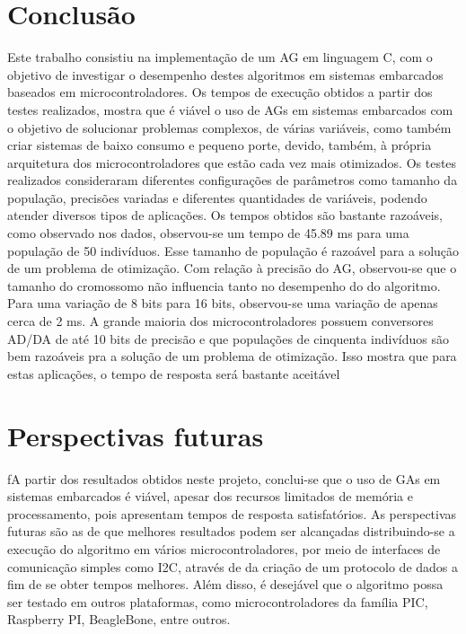 \documentclass[
    12pt,               %
    oneside,%
    a4paper,            %
    english,            %
    french,             %
    spanish,            %
    brazil,             %
    ]{abntex2}
\begin{document}



\chapter[Conclusão]{Conclusão}

  Este trabalho consistiu na implementação de um AG em linguagem C, com o objetivo de investigar o desempenho destes algoritmos em sistemas embarcados baseados em microcontroladores. Os tempos de execução obtidos a partir dos testes realizados, mostra que é viável o uso de AGs em sistemas embarcados com o objetivo de solucionar problemas complexos, de várias variáveis, como também criar sistemas de baixo consumo e pequeno porte, devido, também, à própria arquitetura dos microcontroladores que estão cada vez mais otimizados. Os testes realizados consideraram diferentes configurações de parâmetros como tamanho da população, precisões variadas e diferentes quantidades de variáveis, podendo  atender diversos tipos de aplicações. Os tempos obtidos são bastante razoáveis, como observado nos dados, observou-se um tempo de 45.89 ms para uma população de 50 indivíduos. Esse tamanho de população é razoável para a solução de um problema de otimização. Com relação à precisão do AG, observou-se que o tamanho do cromossomo não influencia tanto no desempenho do do algoritmo. Para uma variação de 8 bits para 16 bits, observou-se uma variação de apenas cerca de 2 ms. A  grande maioria dos microcontroladores possuem conversores AD/DA de até 10 bits de precisão e que populações de cinquenta indivíduos são bem razoáveis pra a solução de um problema de otimização. Isso mostra que para estas aplicações, o tempo de resposta será bastante aceitável

\chapter[Perspectivas futuras]{Perspectivas futuras}

  fA partir dos resultados obtidos neste projeto, conclui-se que o uso de GAs em sistemas embarcados é viável, apesar dos recursos limitados de memória e processamento, pois apresentam tempos de resposta satisfatórios. As perspectivas futuras são as de que melhores resultados podem ser alcançadas distribuindo-se a execução do algoritmo em vários microcontroladores, por meio de interfaces de comunicação simples como I2C, através de da criação de um protocolo de dados a fim de se obter tempos melhores. Além disso,  é desejável que o algoritmo possa ser testado em outros plataformas, como microcontroladores da família PIC, Raspberry PI, BeagleBone, entre outros. 
\end{document}
